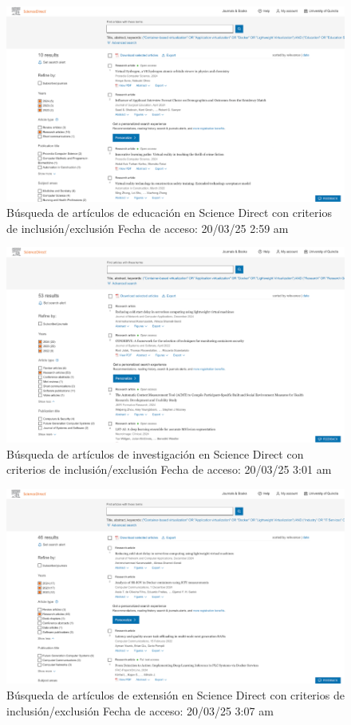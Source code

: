 \FloatBarrier\begin{figure}[H]
    \centering
    \includegraphics[width=\textwidth,keepaspectratio]{apendices/BD/criterios/SD-ed.png}
    \caption{Búsqueda de artículos de educación en Science Direct con criterios de inclusión/exclusión
    Fecha de acceso: 20/03/25 2:59 am
    }\label{fig:busqueda25}
\end{figure}
\FloatBarrier\begin{figure}[H]
    \centering
    \includegraphics[width=\textwidth,keepaspectratio]{apendices/BD/criterios/SD-inv.png}
    \caption{Búsqueda de artículos de investigación en Science Direct con criterios de inclusión/exclusión
    Fecha de acceso: 20/03/25 3:01 am
    }\label{fig:busqueda26}
\end{figure}
\FloatBarrier\begin{figure}[H]
    \centering
    \includegraphics[width=\textwidth,keepaspectratio]{apendices/BD/criterios/SD-ind.png}
    \caption{Búsqueda de artículos de extensión en Science Direct con criterios de inclusión/exclusión
    Fecha de acceso: 20/03/25 3:07 am
    }\label{fig:busqueda27}
\end{figure}
